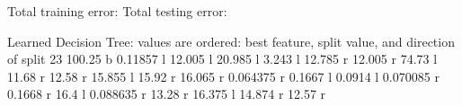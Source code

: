 \documentclass[letterpaper,10pt]{article}
\begin{document}
Total training error:  \newline
Total testing error:  \newline

Learned Decision Tree: \newline
values are ordered: best feature, split value, and direction of split 
 23 100.25 b  0.11857 l  12.005 l  20.985 l  3.243 l  12.785 r  12.005 r  74.73 l  11.68 r  12.58 r  15.855 l  15.92 r  16.065 r  0.064375 r  0.1667 l  0.0914 l  0.070085 r  0.1668 r  16.4 l  0.088635 r  13.28 r  16.375 l  14.874 r  12.57 r \newline
\end{document}

